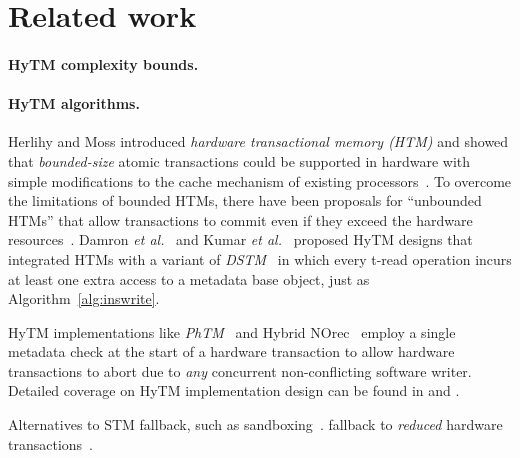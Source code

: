 \section{Related work}
\label{sec:rel}
%
\paragraph{HyTM complexity bounds.}

\paragraph{HyTM algorithms.}
Herlihy and Moss introduced \emph{hardware transactional memory (HTM)}
and showed that \emph{bounded-size} atomic transactions could be supported in hardware
with simple modifications to the cache mechanism of existing processors~\cite{HM93}.
To overcome the limitations of bounded HTMs, there have been proposals for ``unbounded HTMs''
that allow transactions to commit even if they exceed the hardware resources~\cite{hammondhytm,unboundedhtm1}.
Damron \emph{et al.}~\cite{damronhytm} and Kumar \emph{et al.}~\cite{kumarhytm} proposed HyTM designs
that integrated HTMs with a variant of \emph{DSTM}~\cite{HLM+03} in which
every t-read operation incurs at least one extra access to a metadata base object, just as Algorithm~\ref{alg:inswrite}.

HyTM implementations like \emph{PhTM}~\cite{phasedtm} and Hybrid NOrec~\cite{hybridnorec}
employ a single metadata check at the start of a hardware transaction to allow
hardware transactions to abort due to \emph{any} concurrent non-conflicting software writer.
Detailed coverage on HyTM implementation design can be found in \cite{HLR10}
and \cite{riegel-thesis}.

Alternatives to STM fallback, such as sandboxing~\cite{ALM14,CTGM14}.
fallback to \emph{reduced} hardware transactions~\cite{MS13}. 

